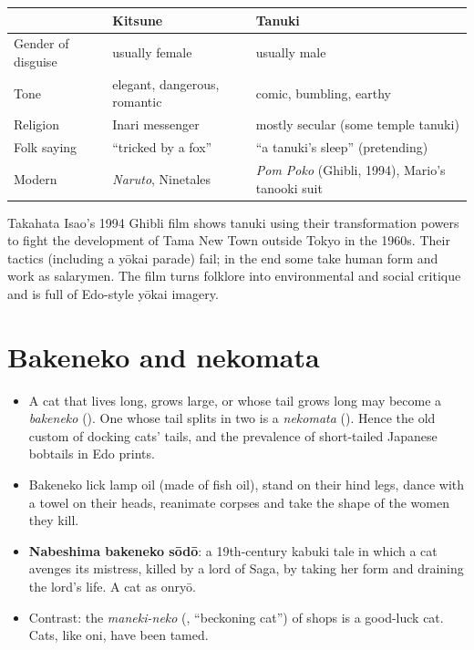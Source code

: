 \begin{center}
\begin{tabular}{p{3.5cm}p{4.8cm}p{4.8cm}}
\toprule
 & Kitsune & Tanuki \\
\midrule
Gender of disguise & usually female & usually male \\
Tone & elegant, dangerous, romantic & comic, bumbling, earthy \\
Religion & Inari messenger & mostly secular (some temple tanuki) \\
Folk saying & ``tricked by a fox'' & ``a tanuki's sleep'' (pretending) \\
Modern & \emph{Naruto}, Ninetales & \emph{Pom Poko} (Ghibli, 1994), Mario's tanooki suit \\
\bottomrule
\end{tabular}
\end{center}

\begin{example}
Takahata Isao's 1994 Ghibli film shows tanuki using their transformation powers to fight
the development of Tama New Town outside Tokyo in the 1960s. Their tactics (including a
yōkai parade) fail; in the end some take human form and work as salarymen. The film turns
folklore into environmental and social critique and is full of Edo-style yōkai imagery.
\end{example}

\section{Bakeneko and nekomata}

\begin{itemize}
  \item A cat that lives long, grows large, or whose tail grows long may become a
        \emph{bakeneko} (). One whose tail splits in two is a
        \emph{nekomata} (). Hence the old custom of docking cats' tails, and the
        prevalence of short-tailed Japanese bobtails in Edo prints.
  \item Bakeneko lick lamp oil (made of fish oil), stand on their hind legs, dance with a
        towel on their heads, reanimate corpses and take the shape of the women they kill.
  \item \textbf{Nabeshima bakeneko sōdō}: a 19th-century kabuki tale in which a cat
        avenges its mistress, killed by a lord of Saga, by taking her form and draining
        the lord's life. A cat as onryō.
  \item Contrast: the \emph{maneki-neko} (, ``beckoning cat'') of shops is a
        good-luck cat. Cats, like oni, have been tamed.
\end{itemize}

